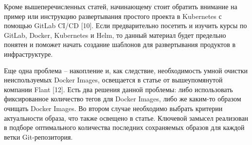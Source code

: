 Кроме вышеперечисленных статей, начинающему стоит обратить внимание на пример или инструкцию развертывания простого проекта в Kubernetes с помощью GitLab CI/CD [10]. Если предварительно посетить и изучить курсы по GitLab, Docker, Kubernetes и Helm, то данный материал будет предельно понятен и поможет начать создание шаблонов для развертывания продуктов в инфраструктуре.

Еще одна проблема -- накопление и, как следствие, необходимость умной очистки неиспользуемых Docker Images, освещается в статье от вышеупомянутой компании Flant [12]. Есть два решения данной проблемы: либо использовать фиксированное количество тегов для Docker Images, либо же каким-то образом очищать Docker Images. Во втором случае необходимо выбрать критерии актуальности образа, что также освещено в статье. Ключевой замысел реализован в подборе оптимального количества последних сохраняемых образов для каждой ветки Git-репозитория.


